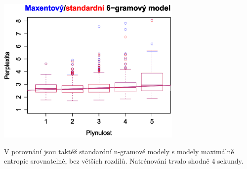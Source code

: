 \documentclass[12pt,a4paper]{report}
\begin{document}
\begin{center}
	\includegraphics[width=90mm]{./grafy/morf/porovnani/pad.svg.eps}	
\end{center}
V porovnání jsou taktéž standardní n-gramové modely s modely maximálně entropie srovnatelné, bez větších rozdílů. Natrénování trvalo shodně 4 sekundy.
\end{document}

